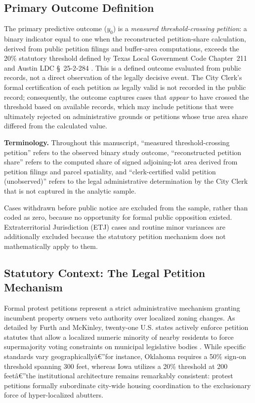 \documentclass[11pt, letterpaper, oneside]{article}
\begin{document}
\subsection{Primary Outcome Definition}
\label{sec:outcome}

The primary predictive outcome ($y_0$) is a \emph{measured threshold-crossing petition}: a binary indicator equal to one when the reconstructed petition-share calculation, derived from public petition filings and buffer-area computations, exceeds the 20\% statutory threshold defined by Texas Local Government Code Chapter~211 and Austin LDC \S~25-2-284 \cite{texas211006}. This is a defined outcome evaluated from public records, not a direct observation of the legally decisive event. The City Clerk's formal certification of each petition as legally valid is not recorded in the public record; consequently, the outcome captures cases that \emph{appear} to have crossed the threshold based on available records, which may include petitions that were ultimately rejected on administrative grounds or petitions whose true area share differed from the calculated value.

\textbf{Terminology.} Throughout this manuscript, ``measured threshold-crossing petition'' refers to the observed binary study outcome, ``reconstructed petition share'' refers to the computed share of signed adjoining-lot area derived from petition filings and parcel spatiality, and ``clerk-certified valid petition (unobserved)'' refers to the legal administrative determination by the City Clerk that is not captured in the analytic sample.

Cases withdrawn before public notice are excluded from the sample, rather than coded as zero, because no opportunity for formal public opposition existed. Extraterritorial Jurisdiction (ETJ) cases and routine minor variances are additionally excluded because the statutory petition mechanism does not mathematically apply to them.

\subsection{Statutory Context: The Legal Petition Mechanism}
\label{sec:statutory_context}

\noindent Formal protest petitions represent a strict administrative mechanism granting incumbent property owners veto authority over localized zoning changes. As detailed by Furth and McKinley, twenty-one U.S. states actively enforce petition statutes that allow a localized numeric minority of nearby residents to force supermajority voting constraints on municipal legislative bodies \cite{furth2025protest}. While specific standards vary geographicallyâ€”for instance, Oklahoma requires a 50\% sign-on threshold spanning 300 feet, whereas Iowa utilizes a 20\% threshold at 200 feetâ€”the institutional architecture remains remarkably consistent: protest petitions formally subordinate city-wide housing coordination to the exclusionary force of hyper-localized abutters. 
\end{document}
